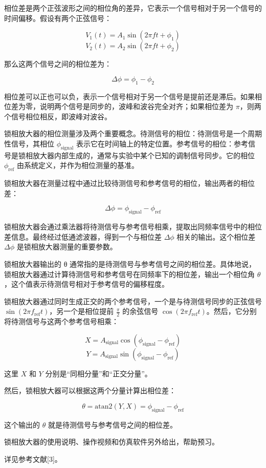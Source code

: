 相位差是两个正弦波形之间的相位角的差异，它表示一个信号相对于另一个信号的时间偏移。假设有两个正弦信号：

\[
V_1(t) = A_1 \sin(2\pi f t + \phi_1)
\]
\[
V_2(t) = A_2 \sin(2\pi f t + \phi_2)
\]

那么这两个信号之间的相位差为：

\[
\Delta \phi = \phi_1 - \phi_2
\]

相位差可以正也可以负，表示一个信号相对于另一个信号是提前还是滞后。如果相位差为零，说明两个信号是同步的，波峰和波谷完全对齐；如果相位差为 \( \pi \)，则两个信号相位相反，即波峰对波谷。

锁相放大器的相位测量涉及两个重要概念。待测信号的相位：待测信号是一个周期性信号，其相位 \( \phi_{\text{signal}} \) 表示它在时间轴上的特定位置。参考信号的相位：参考信号是锁相放大器内部生成的，通常与实验中某个已知的调制信号同步。它的相位 \( \phi_{\text{ref}} \) 由系统定义，并作为相位测量的基准。

锁相放大器在测量过程中通过比较待测信号和参考信号的相位，输出两者的相位差：

\[
\Delta \phi = \phi_{\text{signal}} - \phi_{\text{ref}}
\]

锁相放大器会通过乘法器将待测信号与参考信号相乘，提取出同频率信号中的相位差信息。最终经过低通滤波器，得到一个与相位差 \( \Delta \phi \) 相关的输出。这个相位差 \( \Delta \phi \) 是锁相放大器测量的重要参数。

锁相放大器输出的 θ 通常指的是待测信号与参考信号之间的相位差。具体地说，锁相放大器通过计算待测信号和参考信号在同频率下的相位差，输出一个相位角 \( \theta \)，这个值表示待测信号相对于参考信号的偏移程度。

锁相放大器通过同时生成正交的两个参考信号，一个是与待测信号同步的正弦信号 \( \sin(2\pi f_{\text{ref}} t) \)，另一个是相位提前 \( \frac{\pi}{2} \) 的余弦信号 \( \cos(2\pi f_{\text{ref}} t) \)。然后，它分别将待测信号与这两个参考信号相乘：

\[
X = A_{\text{signal}} \cos(\phi_{\text{signal}} - \phi_{\text{ref}})
\]
\[
Y = A_{\text{signal}} \sin(\phi_{\text{signal}} - \phi_{\text{ref}})
\]

这里 \( X \) 和 \( Y \) 分别是“同相分量”和“正交分量”。

然后，锁相放大器可以根据这两个分量计算出相位差：

\[
\theta = \text{atan2}(Y, X) = \phi_{\text{signal}} - \phi_{\text{ref}}
\]

这个输出的 \( \theta \) 就是待测信号与参考信号之间的相位差。

\begin{question}
	锁相放大器的使用说明、操作视频和仿真软件另外给出，帮助预习。
\end{question}
详见参考文献[3]。

